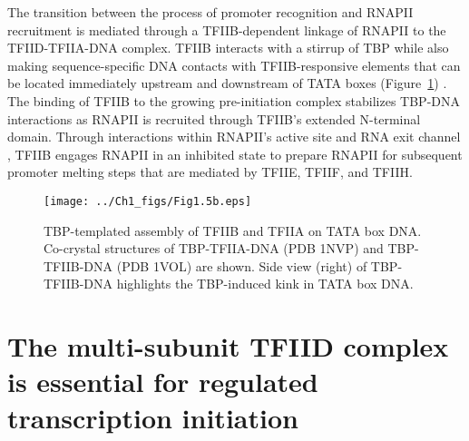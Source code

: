 \indent The transition between the process of promoter recognition and RNAPII recruitment is mediated through a TFIIB-dependent linkage of RNAPII to the TFIID-TFIIA-DNA complex. TFIIB interacts with a stirrup of TBP while also making sequence-specific DNA contacts with TFIIB-responsive elements that can be located immediately upstream and downstream of TATA boxes (Figure~\ref{fig:Fig1.5}) \cite{Lagrange_2618, Nikolov_3177}. The binding of TFIIB to the growing pre-initiation complex stabilizes TBP-DNA interactions as RNAPII is recruited through TFIIB’s extended N-terminal domain. Through interactions within RNAPII's active site and RNA exit channel \cite{Kostrewa_659}, TFIIB engages RNAPII in an inhibited state to prepare RNAPII for subsequent promoter melting steps that are mediated by TFIIE, TFIIF, and TFIIH. \\
\begin{figure}
\centering
\texttt{[image: ../Ch1\_figs/Fig1.5b.eps]}
\caption[TBP-templated assembly of TFIIB and TFIIA on TATA box DNA]{TBP-templated assembly of TFIIB and TFIIA on TATA box DNA. Co-crystal structures of TBP-TFIIA-DNA (PDB 1NVP) \cite{Bleichenbacher_2003} and TBP-TFIIB-DNA (PDB 1VOL) \cite{Nikolov_3177} are shown.  Side view (right) of TBP-TFIIB-DNA highlights the TBP-induced kink in TATA box DNA.}
\label{fig:Fig1.5}
\end{figure}


\section{The multi-subunit TFIID complex is essential for regulated transcription initiation}

